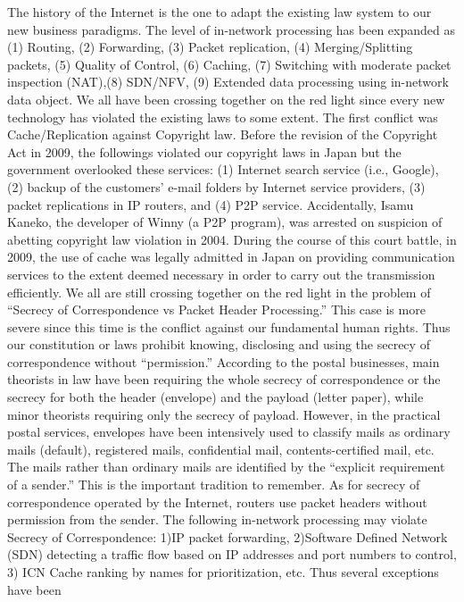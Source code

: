 \documentclass[a4paper,UKenglish]{dagrep}
\begin{document}
The history of the Internet is the one to adapt the existing law system
to our new business paradigms. The level of in-network processing has
been expanded as (1) Routing, (2) Forwarding, (3) Packet replication,
(4) Merging/Splitting packets, (5) Quality of Control, (6) Caching, (7)
Switching with moderate packet inspection (NAT),(8) SDN/NFV, (9)
Extended data processing using in-network data object. We all have been
crossing together on the red light since every new technology has
violated the existing laws to some extent.
The first conflict was Cache/Replication against Copyright law. Before
the revision of the Copyright Act in 2009, the followings violated our
copyright laws in Japan but the government overlooked these services: (1)
Internet search service (i.e., Google), (2) backup of the customers' e-mail
folders by Internet service providers, (3) packet replications in IP
routers, and (4) P2P service. Accidentally, Isamu Kaneko, the developer
of Winny (a P2P program), was arrested on suspicion of abetting
copyright law violation in 2004. During the course of this court battle,
in 2009, the use of cache was legally admitted in Japan on providing
communication services to the extent deemed necessary in order to carry
out the transmission efficiently.
We all are still crossing together on the red light in the problem of
“Secrecy of Correspondence vs Packet Header Processing.” This case is
more severe since this time is the conflict against our fundamental
human rights. Thus our constitution or laws prohibit knowing, disclosing
and using the secrecy of correspondence without ``permission.''
According to the postal businesses, main theorists in law have been
requiring the whole secrecy of correspondence or the secrecy for both
the header (envelope) and the payload (letter paper), while minor
theorists requiring only the secrecy of payload. However, in the
practical postal services, envelopes have been intensively used to
classify mails as ordinary mails (default), registered mails,
confidential mail, contents-certified mail, etc. The mails rather than
ordinary mails are identified by the ``explicit requirement of a sender.''
This is the important tradition to remember.
As for secrecy of correspondence operated by the Internet, routers use
packet headers without permission from the sender. The following
in-network processing may violate Secrecy of Correspondence: 1)IP packet
forwarding, 2)Software Defined Network (SDN) detecting a traffic flow
based on IP addresses and port numbers to control, 3) ICN Cache ranking
by names for prioritization, etc. Thus several exceptions have been
\end{document}
